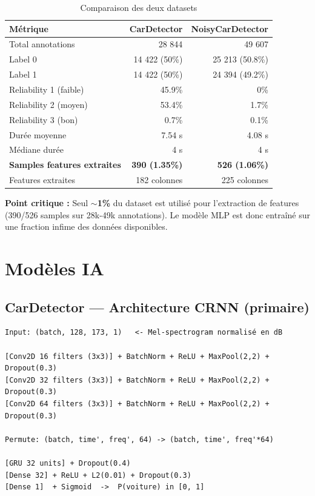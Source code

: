 \documentclass[11pt,a4paper]{article}
\begin{document}
\begin{table}[htbp]
\centering
\begin{tabular}{@{}lrr@{}}
\toprule
\textbf{Métrique} & \textbf{CarDetector} & \textbf{NoisyCarDetector} \\
\midrule
Total annotations & 28 844 & 49 607 \\
Label 0 & 14 422 (50\%) & 25 213 (50.8\%) \\
Label 1 & 14 422 (50\%) & 24 394 (49.2\%) \\
Reliability 1 (faible) & 45.9\% & 0\% \\
Reliability 2 (moyen) & 53.4\% & 1.7\% \\
Reliability 3 (bon) & 0.7\% & 0.1\% \\
Durée moyenne & 7.54 s & 4.08 s \\
Médiane durée & 4 s & 4 s \\
\textbf{Samples features extraites} & \textbf{390 (1.35\%)} & \textbf{526 (1.06\%)} \\
Features extraites & 182 colonnes & 225 colonnes \\
\bottomrule
\end{tabular}
\caption{Comparaison des deux datasets}
\end{table}

\begin{warningbox}
\textbf{Point critique :} Seul \textbf{$\sim$1\%} du dataset est utilisé pour l'extraction de
features (390/526 samples sur 28k-49k annotations). Le modèle MLP est donc entraîné sur une
fraction infime des données disponibles.
\end{warningbox}

\section{Modèles IA}

\subsection{CarDetector — Architecture CRNN (primaire)}

\begin{lstlisting}[style=tree,caption={Architecture CRNN CarDetector}]
Input: (batch, 128, 173, 1)   <- Mel-spectrogram normalisé en dB

[Conv2D 16 filters (3x3)] + BatchNorm + ReLU + MaxPool(2,2) + Dropout(0.3)
[Conv2D 32 filters (3x3)] + BatchNorm + ReLU + MaxPool(2,2) + Dropout(0.3)
[Conv2D 64 filters (3x3)] + BatchNorm + ReLU + MaxPool(2,2) + Dropout(0.3)

Permute: (batch, time', freq', 64) -> (batch, time', freq'*64)

[GRU 32 units] + Dropout(0.4)
[Dense 32] + ReLU + L2(0.01) + Dropout(0.3)
[Dense 1]  + Sigmoid  ->  P(voiture) in [0, 1]
\end{lstlisting}
\end{document}
